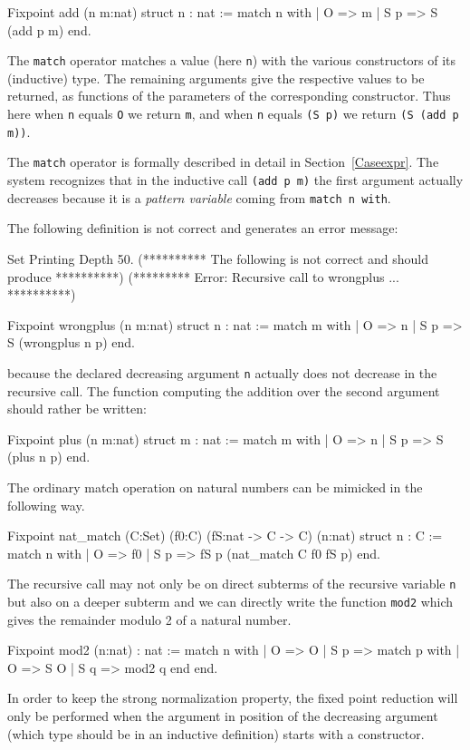 \begin{coq_example}
Fixpoint add (n m:nat) {struct n} : nat :=
  match n with
  | O => m
  | S p => S (add p m)
  end.
\end{coq_example}

The {\tt match} operator matches a value (here \verb:n:) with the
various constructors of its (inductive) type. The remaining arguments
give the respective values to be returned, as functions of the
parameters of the corresponding constructor. Thus here when \verb:n:
equals \verb:O: we return \verb:m:, and when \verb:n: equals 
\verb:(S p): we return \verb:(S (add p m)):.

The {\tt match} operator is formally described
in detail in Section~\ref{Caseexpr}.  The system recognizes that in
the inductive call {\tt (add p m)} the first argument actually
decreases because it is a {\em pattern variable} coming from {\tt match
  n with}.

\Example The following definition is not correct and generates an
error message:

\begin{coq_eval}
Set Printing Depth 50.
(********** The following is not correct and should produce **********)
(*********      Error: Recursive call to wrongplus ...      **********)
\end{coq_eval}
\begin{coq_example}
Fixpoint wrongplus (n m:nat) {struct n} : nat :=
  match m with
  | O => n
  | S p => S (wrongplus n p)
  end.
\end{coq_example}

because the declared decreasing argument {\tt n} actually does not
decrease in the recursive call.  The function computing the addition
over the second argument should rather be written:

\begin{coq_example*}
Fixpoint plus (n m:nat) {struct m} : nat :=
  match m with
  | O => n
  | S p => S (plus n p)
  end.
\end{coq_example*}

The ordinary match operation on natural numbers can be mimicked in the
following way.
\begin{coq_example*}
Fixpoint nat_match 
  (C:Set) (f0:C) (fS:nat -> C -> C) (n:nat) {struct n} : C :=
  match n with
  | O => f0
  | S p => fS p (nat_match C f0 fS p)
  end.
\end{coq_example*}
The recursive call may not only be on direct subterms of the recursive
variable {\tt n} but also on a deeper subterm and we can directly
write the function {\tt mod2} which gives the remainder modulo 2 of a
natural number.
\begin{coq_example*}
Fixpoint mod2 (n:nat) : nat :=
  match n with
  | O => O
  | S p => match p with
           | O => S O
           | S q => mod2 q
           end
  end.
\end{coq_example*}
In order to keep the strong normalization property, the fixed point
reduction will only be performed when the argument in position of the
decreasing argument (which type should be in an inductive definition)
starts with a constructor.

